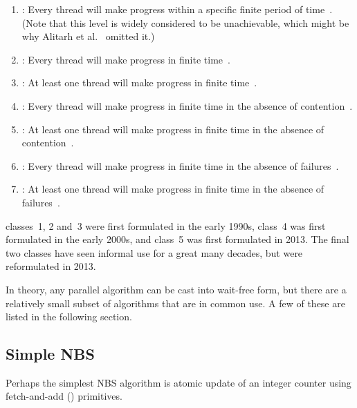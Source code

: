 \begin{enumerate}
\item	\emph{}: Every thread
	will make progress within
	a specific finite period of time~\cite{Herlihy91}.
	(Note that this level is
	widely considered to be unachievable, which might be why
	Alitarh et al.~\cite{DanAlitarh2013PracticalProgress}
	omitted it.)
\item	\emph{}: Every thread will make progress
	in finite time~\cite{Herlihy93}.
\item	\emph{}: At least one thread will
	make progress in finite time~\cite{Herlihy93}.
\item	\emph{}: Every thread will
	make progress in finite time in the absence of
	contention~\cite{HerlihyLM03}.
\item	\emph{}: At least one thread will
	make progress in finite time in the absence of
	contention~\cite{DanAlitarh2013PracticalProgress}.
\item	\emph{}: Every thread will
	make progress in finite time in the absence of
	failures~\cite{DanAlitarh2013PracticalProgress}.
\item	\emph{}: At least one thread will
	make progress in finite time in the absence of
	failures~\cite{DanAlitarh2013PracticalProgress}.
\end{enumerate}

 classes~1, 2 and~3 were first formulated in the early 1990s,
class~4 was first formulated in the early 2000s,
and class~5 was first formulated in 2013.
The final two classes have seen informal use for a great many decades,
but were reformulated in 2013.

In theory, any parallel algorithm can be cast into wait-free form,
but there are a relatively small subset of  algorithms that are
in common use.
A few of these are listed in the following section.

\subsection{Simple NBS}
\label{sec:advsync:Simple NBS}

Perhaps the simplest NBS algorithm is atomic update of an integer
counter using fetch-and-add () primitives.

